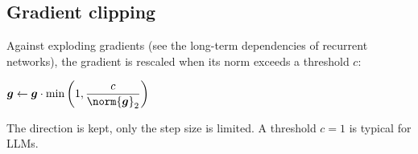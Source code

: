 \subsection{Gradient clipping}
Against exploding gradients (see the long-term dependencies of recurrent networks), the
gradient is rescaled when its norm exceeds a threshold $c$:
\begin{center}
    $\bm{g}\leftarrow\bm{g}\cdot\min\left(1,\dfrac{c}{\norm{\bm{g}}_{2}}\right)$
\end{center}
The direction is kept, only the step size is limited. A threshold $c=1$ is typical for LLMs.
